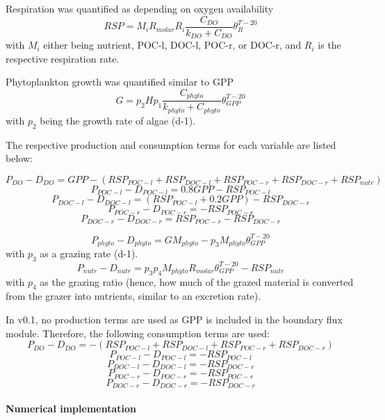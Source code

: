 \documentclass[
  letterpaper,
  DIV=11,
  numbers=noendperiod]{scrartcl}
\let\oldparagraph\paragraph
\renewcommand{\paragraph}[1]{\oldparagraph{#1}\mbox{}}
\begin{document}
Respiration was quantified as depending on oxygen availability \[
RSP = M_{i} R_{molar} R_i \frac{C_{DO}}{k_{DO} + C_{DO}} \theta_{R}^{T-20}
\] with \(M_{i}\) either being nutrient, POC-l, DOC-l, POC-r, or DOC-r,
and \(R_i\) is the respective respiration rate.

Phytoplankton growth was quantified similar to GPP \[
G = p_2 H p_1 \frac{C_{phyto}}{k_{phyto} + C_{phyto}} \theta_{GPP}^{T-20}
\] with \(p_2\) being the growth rate of algae (d-1).

The respective production and consumption terms for each variable are
listed below:

\[
P_{DO} - D_{DO} = GPP - (RSP_{POC-l} + RSP_{DOC-l} + RSP_{POC-r} + RSP_{DOC-r} + RSP_{nutr})
\] \[
P_{POC-l} - D_{POC-l} = 0.8 GPP - RSP_{POC-l} 
\] \[
P_{DOC-l} - D_{DOC-l} = (RSP_{POC-l} + 0.2 GPP) - RSP_{DOC-r} 
\] \[
P_{POC-r} - D_{POC-r} =  - RSP_{POC-r} 
\] \[
P_{DOC-r} - D_{DOC-r} = RSP_{POC-r} - RSP_{DOC-r} 
\]

\[
P_{phyto} - D_{phyto} = G M_{phyto} - p_3 M_{phyto}  \theta_{GPP}^{T-20}
\] with \(p_3\) as a grazing rate (d-1). \[
P_{nutr} - D_{nutr} = p_3 p_4 M_{phyto} R_{molar}  \theta_{GPP}^{T-20} - RSP_{nutr}
\] with \(p_4\) as the grazing ratio (hence, how much of the grazed
material is converted from the grazer into nutrients, similar to an
excretion rate).

\begin{tcolorbox}[enhanced jigsaw, colframe=quarto-callout-note-color-frame, leftrule=.75mm, arc=.35mm, coltitle=black, titlerule=0mm, rightrule=.15mm, title=\textcolor{quarto-callout-note-color}{\faInfo}\hspace{0.5em}{Note}, colbacktitle=quarto-callout-note-color!10!white, bottomtitle=1mm, toprule=.15mm, colback=white, left=2mm, opacitybacktitle=0.6, breakable, toptitle=1mm, bottomrule=.15mm, opacityback=0]

In v0.1, no production terms are used as GPP is included in the boundary
flux module. Therefore, the following consumption terms are used: \[
P_{DO} - D_{DO} = - (RSP_{POC-l} + RSP_{DOC-l} + RSP_{POC-r} + RSP_{DOC-r})
\] \[
P_{POC-l} - D_{POC-l} = - RSP_{POC-l} 
\] \[
P_{DOC-l} - D_{DOC-l} = - RSP_{DOC-r} 
\] \[
P_{POC-r} - D_{POC-r} =  - RSP_{POC-r} 
\] \[
P_{DOC-r} - D_{DOC-r} =  - RSP_{DOC-r} 
\]

\end{tcolorbox}

\hypertarget{numerical-implementation-1}{%
\paragraph{Numerical implementation}\label{numerical-implementation-1}}
\end{document}
